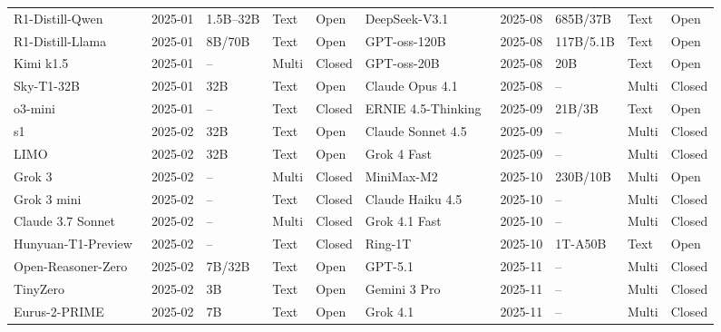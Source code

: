 \begin{table}[htbp]
{\begin{tabular}{@{} lllll | lllll @{}}
R1-Distill-Qwen~\cite{deepseek2025r1} & 2025-01 & 1.5B--32B & Text & Open & DeepSeek-V3.1~\cite{deepseekai2025deepseekv31} & 2025-08 & 685B/37B & Text & Open \\
R1-Distill-Llama~\cite{deepseek2025r1} & 2025-01 & 8B/70B & Text & Open & GPT-oss-120B~\cite{agarwal2025gptoss} & 2025-08 & 117B/5.1B & Text & Open \\
Kimi k1.5~\cite{kimiteam2025kimiK15} & 2025-01 & -- & Multi & Closed & GPT-oss-20B~\cite{agarwal2025gptoss} & 2025-08 & 20B & Text & Open \\
Sky-T1-32B~\cite{novasky2025skyt1} & 2025-01 & 32B & Text & Open & Claude Opus 4.1~\cite{anthropic2025claudeopus41} & 2025-08 & -- & Multi & Closed \\
o3-mini~\cite{openai2025o3minisystemcard} & 2025-01 & -- & Text & Closed & ERNIE 4.5-Thinking~\cite{baidu2025ernie45thinking} & 2025-09 & 21B/3B & Text & Open \\
s1~\cite{muennighoff2025s1} & 2025-02 & 32B & Text & Open & Claude Sonnet 4.5~\cite{anthropic2025claudesonnet45} & 2025-09 & -- & Multi & Closed \\
LIMO~\cite{ye2025limo} & 2025-02 & 32B & Text & Open & Grok 4 Fast~\cite{xai2025grok4} & 2025-09 & -- & Multi & Closed \\
Grok 3~\cite{xai2025grok3} & 2025-02 & -- & Multi & Closed & MiniMax-M2~\cite{minimax2025minimaxm2} & 2025-10 & 230B/10B & Multi & Open \\
Grok 3 mini~\cite{xai2025grok3} & 2025-02 & -- & Text & Closed & Claude Haiku 4.5~\cite{anthropic2025claudehaiku45} & 2025-10 & -- & Multi & Closed \\
Claude 3.7 Sonnet~\cite{anthropic2025claude37sonnet} & 2025-02 & -- & Multi & Closed & Grok 4.1 Fast~\cite{xai2026grok41} & 2025-10 & -- & Multi & Closed \\
Hunyuan-T1-Preview~\cite{tencent2025hunyuanT1} & 2025-02 & -- & Text & Closed & Ring-1T~\cite{team2025every} & 2025-10 & 1T-A50B & Text & Open \\
Open-Reasoner-Zero~\cite{hu2025openreasonerzero} & 2025-02 & 7B/32B & Text & Open & GPT-5.1~\cite{openai2025gpt51} & 2025-11 & -- & Multi & Closed \\
TinyZero~\cite{pan2025tinyzero} & 2025-02 & 3B & Text & Open & Gemini 3 Pro~\cite{google2025gemini3} & 2025-11 & -- & Multi & Closed \\
Eurus-2-PRIME~\cite{cui2025prime} & 2025-02 & 7B & Text & Open & Grok 4.1~\cite{xai2025grok41} & 2025-11 & -- & Multi & Closed \\

\end{tabular}}
\end{table}

